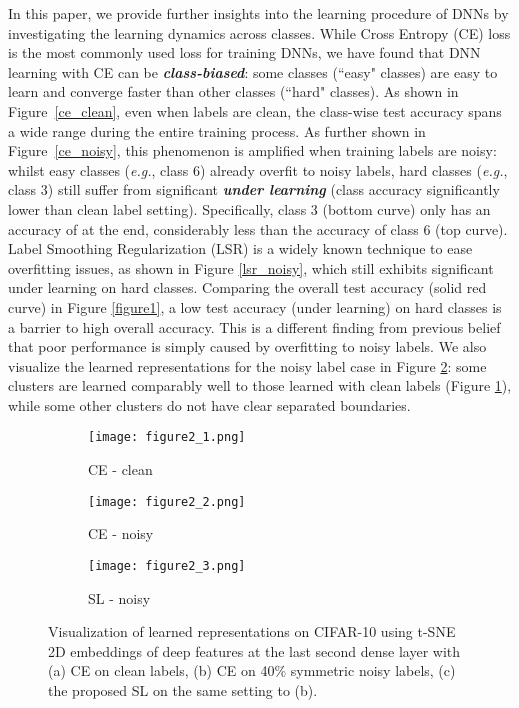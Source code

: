 \documentclass[10pt,twocolumn,letterpaper]{article}
\begin{document}
In this paper, we provide further insights into the learning procedure of DNNs by investigating the learning dynamics across classes. While Cross Entropy (CE) loss is the most commonly used loss for training DNNs, we have found that DNN learning with CE can be \textbf{\emph{class-biased}}: some classes (``easy" classes) are easy to learn and converge faster than other classes (``hard" classes). As shown in Figure~\ref{ce_clean}, even when labels are clean, the class-wise test accuracy spans a wide range during the entire training process. 
As further shown in Figure~\ref{ce_noisy}, this phenomenon is amplified when training labels are noisy: whilst easy classes (\textit{e.g.}, class 6) already overfit to noisy labels, hard classes (\textit{e.g.}, class 3) still suffer from significant \textbf{\emph{under learning}} (class accuracy significantly lower than clean label setting). Specifically, class 3 (bottom curve) only has an accuracy of  at the end, considerably less than the  accuracy of class 6 (top curve). Label Smoothing Regularization (LSR) \cite{szegedy2016rethinking,pereyra2017regularizing} is a widely known technique to ease overfitting issues, as shown in Figure \ref{lsr_noisy}, which still exhibits significant under learning on hard classes. Comparing the overall test accuracy (solid red curve) in Figure \ref{figure1}, a low test accuracy (under learning) on hard classes is a barrier to high overall accuracy. This is a different finding from previous belief that poor performance is simply caused by overfitting to noisy labels. We also visualize the learned representations for the noisy label case in Figure \ref{rep_ce_noisy}: some clusters are learned comparably well to those learned with clean labels (Figure \ref{rep_ce_clean}), while some other clusters do not have clear separated boundaries.

\begin{figure}[!t]
	\centering
	\begin{subfigure}{0.32\linewidth}
		\texttt{[image: figure2\_1.png]}
		\caption{CE - clean}
		\label{rep_ce_clean}
	\end{subfigure}
	\begin{subfigure}{0.32\linewidth} 
		\texttt{[image: figure2\_2.png]}
		\caption{CE - noisy} 
		\label{rep_ce_noisy}
	\end{subfigure}
	\begin{subfigure}{0.32\linewidth}
		\texttt{[image: figure2\_3.png]}
		\caption{SL - noisy}
		\label{rep_sce_noisy}
	\end{subfigure}
	\vspace{-0.1 in}
	\caption{Visualization of learned representations on CIFAR-10 using t-SNE 2D embeddings of deep features at the last second dense layer with (a) CE on clean labels, (b) CE on 40\% symmetric noisy labels, (c) the proposed SL on the same setting to (b).}
	\label{ce_sce_rep_40}
	\vspace{-0.15 in}
\end{figure}
\end{document}
